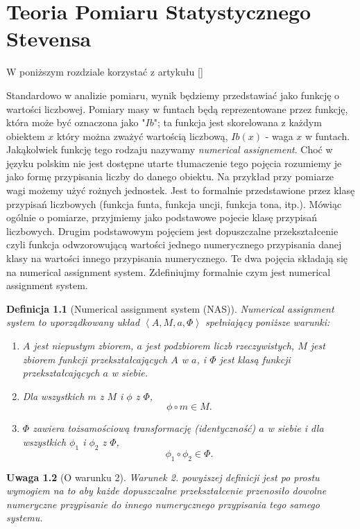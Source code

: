 \documentclass[12pt,a4paper]{report}
\newtheorem{definition}{Definicja}[chapter]
\newtheorem{remark}[definition]{Uwaga}
\newcommand{\tuple}[1]{\left\langle {#1} \right\rangle}
\begin{document}
\chapter{Teoria Pomiaru Statystycznego Stevensa}

W poniższym rozdziale korzystać z artykułu [{\citep{adams1965theory}}]

Standardowo w analizie pomiaru, wynik będziemy przedstawiać jako funkcję o wartości liczbowej. Pomiary masy w funtach będą reprezentowane przez funkcję, która może być oznaczona jako "$Ib$";  ta funkcja jest skorelowana z każdym obiektem $x$ który można zważyć wartością liczbową, $Ib(x)$ - waga $x$ w funtach. Jakąkolwiek funkcję tego rodzaju nazywamy \textit{numerical assignement}. Choć w języku polskim nie jest dostępne utarte tłumaczenie tego pojęcia rozumiemy je jako formę przypisania liczby do danego obiektu. Na przykład przy pomiarze wagi możemy użyć rożnych jednostek. Jest to formalnie przedstawione  przez klasę przypisań liczbowych (funkcja funta, funkcja uncji, funkcja tona, itp.). Mówiąc ogólnie o pomiarze, przyjmiemy jako podstawowe pojecie klasę przypisań liczbowych. Drugim podstawowym pojęciem jest dopuszczalne przekształcenie czyli funkcja odwzorowującą wartości jednego numerycznego przypisania danej klasy na wartości innego przypisania numerycznego. Te dwa pojęcia składają się na numerical assignment system. Zdefiniujmy formalnie czym jest numerical assignment system.
\begin{definition}[Numerical assignment system (NAS)]
Numerical assignment system to uporządkowany układ $\tuple{A, M, a, \Phi}$ spełniający poniższe warunki:
\begin{enumerate}
\item
$A$ jest niepustym zbiorem, $a$ jest podzbiorem liczb rzeczywistych, $M$ jest zbiorem funkcji przekształcających $A$ w $a$, i $\Phi$ jest klasą funkcji przekształcających $a$ w siebie.  
\item
Dla wszystkich $m$ z $M$ i $\phi$ z $\Phi$, 
$$
\phi \circ m \in M.
$$ 
\item
$\Phi$ zawiera tożsamościową transformację (identyczność) $a$ w siebie i dla wszystkich $\phi_{1}$ i $\phi_{2}$ z $\Phi$, 
$$
\phi_{1} \circ \phi_{2} \in \Phi.
$$

\end{enumerate}

\end{definition}

\begin{remark}[O warunku 2]
Warunek 2. powyższej definicji jest po prostu wymogiem na to aby każde dopuszczalne przekształcenie  przenosiło dowolne numeryczne przypisanie do innego numerycznego przypisania tego samego systemu.
\end{remark}
\end{document}

